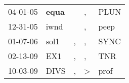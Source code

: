 \begin{supertabular}{p{0.07\textwidth}p{0.06\textwidth}p{0.02\textwidth}p{0.02\textwidth}p{0.06\textwidth}}
 04-01-05\textsuperscript{} &  \textbf{equa\textsuperscript{}} &    &             , &  PLUN\textsuperscript{} \\
 12-31-05\textsuperscript{} &           iwnd\textsuperscript{} &    &             , &  peep\textsuperscript{} \\
 01-07-06\textsuperscript{} &           sol1\textsuperscript{} &  , &             , &  SYNC\textsuperscript{} \\
 02-13-09\textsuperscript{} &            EX1\textsuperscript{} &  , &             , &   TNR\textsuperscript{} \\
 10-03-09\textsuperscript{} &           DIVS\textsuperscript{} &  , &  \textgreater &  prof\textsuperscript{} \\
\end{supertabular}
